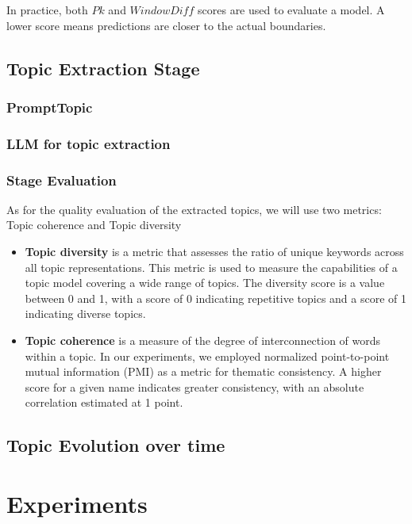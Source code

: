 \documentclass[PMI,VKR]{HSEUniversity}
\begin{document}
In practice, both $Pk$ and $WindowDiff$ scores are used to evaluate a model. 
A lower score means predictions are closer to the actual boundaries.

\section{Topic Extraction Stage}


\subsection{PromptTopic}


\subsection{LLM for topic extraction}

\subsection{Stage Evaluation}
As for the quality evaluation of the extracted topics, we will use two metrics: Topic coherence and Topic diversity
\begin{itemize}
    \item \textbf{Topic diversity} is a metric that assesses the ratio of unique keywords across all topic representations. This metric is used to measure the capabilities of a topic model covering a wide range of topics. The diversity score is a value between 0 and 1, with a score of 0 indicating repetitive topics and a score of 1 indicating diverse topics.
    \item \textbf{Topic coherence} is a measure of the degree of interconnection of words within a topic. In our experiments, we employed normalized point-to-point mutual information (PMI) as a metric for thematic consistency. A higher score for a given name indicates greater consistency, with an absolute correlation estimated at 1 point.
    \end{itemize}


\section{Topic Evolution over time}






\newpage
\chapter{Experiments}
\end{document}
